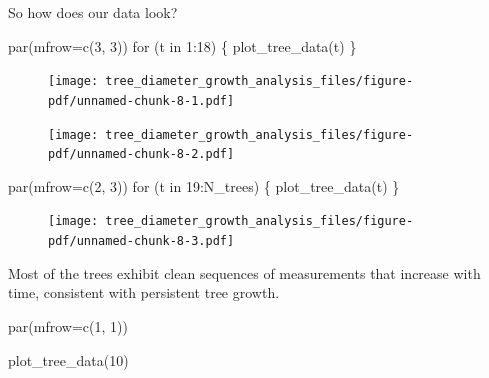 \documentclass[
  letterpaper,
  DIV=11,
  numbers=noendperiod]{scrartcl}
\newenvironment{Shaded}{\begin{snugshade}}{\end{snugshade}}
\newcommand{\AttributeTok}[1]{\textcolor[rgb]{0.40,0.45,0.13}{#1}}
\newcommand{\ControlFlowTok}[1]{\textcolor[rgb]{0.00,0.23,0.31}{#1}}
\newcommand{\DecValTok}[1]{\textcolor[rgb]{0.68,0.00,0.00}{#1}}
\newcommand{\FunctionTok}[1]{\textcolor[rgb]{0.28,0.35,0.67}{#1}}
\newcommand{\NormalTok}[1]{\textcolor[rgb]{0.00,0.23,0.31}{#1}}
\newcommand{\SpecialCharTok}[1]{\textcolor[rgb]{0.37,0.37,0.37}{#1}}
\begin{document}
So how does our data look?

\begin{Shaded}
\begin{Highlighting}[]
\FunctionTok{par}\NormalTok{(}\AttributeTok{mfrow=}\FunctionTok{c}\NormalTok{(}\DecValTok{3}\NormalTok{, }\DecValTok{3}\NormalTok{))}
\ControlFlowTok{for}\NormalTok{ (t }\ControlFlowTok{in} \DecValTok{1}\SpecialCharTok{:}\DecValTok{18}\NormalTok{) \{}
  \FunctionTok{plot\_tree\_data}\NormalTok{(t)}
\NormalTok{\}}
\end{Highlighting}
\end{Shaded}

\begin{figure}[H]

{\centering \texttt{[image: tree\_diameter\_growth\_analysis\_files/figure-pdf/unnamed-chunk-8-1.pdf]}

}

\end{figure}

\begin{figure}[H]

{\centering \texttt{[image: tree\_diameter\_growth\_analysis\_files/figure-pdf/unnamed-chunk-8-2.pdf]}

}

\end{figure}

\begin{Shaded}
\begin{Highlighting}[]
\FunctionTok{par}\NormalTok{(}\AttributeTok{mfrow=}\FunctionTok{c}\NormalTok{(}\DecValTok{2}\NormalTok{, }\DecValTok{3}\NormalTok{))}
\ControlFlowTok{for}\NormalTok{ (t }\ControlFlowTok{in} \DecValTok{19}\SpecialCharTok{:}\NormalTok{N\_trees) \{}
  \FunctionTok{plot\_tree\_data}\NormalTok{(t)}
\NormalTok{\}}
\end{Highlighting}
\end{Shaded}

\begin{figure}[H]

{\centering \texttt{[image: tree\_diameter\_growth\_analysis\_files/figure-pdf/unnamed-chunk-8-3.pdf]}

}

\end{figure}

Most of the trees exhibit clean sequences of measurements that increase
with time, consistent with persistent tree growth.

\begin{Shaded}
\begin{Highlighting}[]
\FunctionTok{par}\NormalTok{(}\AttributeTok{mfrow=}\FunctionTok{c}\NormalTok{(}\DecValTok{1}\NormalTok{, }\DecValTok{1}\NormalTok{))}

\FunctionTok{plot\_tree\_data}\NormalTok{(}\DecValTok{10}\NormalTok{)}
\end{Highlighting}
\end{Shaded}
\end{document}
